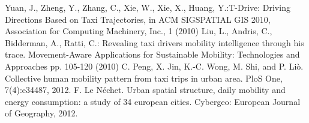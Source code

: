 \documentclass[a4paper, 10pt, conference]{ieeeconf}      %
\begin{document}
\begin{thebibliography}{99}
\bibitem{}Yuan, J., Zheng, Y., Zhang, C., Xie, W., Xie, X., Huang, Y.:T-Drive: Driving Directions Based on Taxi Trajectories, in ACM SIGSPATIAL GIS 2010, Association for Computing Machinery, Inc., 1 (2010) 
\bibitem{}Liu, L., Andris, C., Bidderman, A., Ratti, C.: Revealing taxi drivers mobility intelligence through his trace. Movement-Aware Applications for Sustainable Mobility: Technologies and Approaches pp. 105-120 (2010) 
\bibitem{}C. Peng, X. Jin, K.-C. Wong, M. Shi, and P. Liò. Collective human mobility pattern from taxi trips in urban area. PloS One, 7(4):e34487, 2012.
\bibitem{}F. Le Néchet. Urban spatial structure, daily mobility and energy consumption: a study of 34 european cities. Cybergeo: European Journal of Geography, 2012.

\end{thebibliography}
\end{document}
